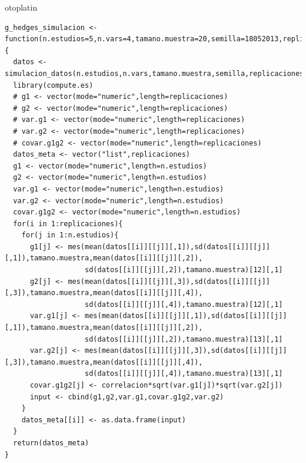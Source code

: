 otoplatin\documentclass[a4paper,openright,12pt]{report}
\begin{document}
{\begin{verbatim}
g_hedges_simulacion <- function(n.estudios=5,n.vars=4,tamano.muestra=20,semilla=18052013,replicaciones=5,correlacion=0){
  datos <- simulacion_datos(n.estudios,n.vars,tamano.muestra,semilla,replicaciones)
  library(compute.es)
  # g1 <- vector(mode="numeric",length=replicaciones)
  # g2 <- vector(mode="numeric",length=replicaciones)
  # var.g1 <- vector(mode="numeric",length=replicaciones)
  # var.g2 <- vector(mode="numeric",length=replicaciones)
  # covar.g1g2 <- vector(mode="numeric",length=replicaciones) 
  datos_meta <- vector("list",replicaciones)
  g1 <- vector(mode="numeric",length=n.estudios)
  g2 <- vector(mode="numeric",length=n.estudios)
  var.g1 <- vector(mode="numeric",length=n.estudios)
  var.g2 <- vector(mode="numeric",length=n.estudios)
  covar.g1g2 <- vector(mode="numeric",length=n.estudios) 
  for(i in 1:replicaciones){
    for(j in 1:n.estudios){
      g1[j] <- mes(mean(datos[[i]][[j]][,1]),sd(datos[[i]][[j]][,1]),tamano.muestra,mean(datos[[i]][[j]][,2]),
                   sd(datos[[i]][[j]][,2]),tamano.muestra)[12][,1]
      g2[j] <- mes(mean(datos[[i]][[j]][,3]),sd(datos[[i]][[j]][,3]),tamano.muestra,mean(datos[[i]][[j]][,4]),
                   sd(datos[[i]][[j]][,4]),tamano.muestra)[12][,1]
      var.g1[j] <- mes(mean(datos[[i]][[j]][,1]),sd(datos[[i]][[j]][,1]),tamano.muestra,mean(datos[[i]][[j]][,2]),
                   sd(datos[[i]][[j]][,2]),tamano.muestra)[13][,1]
      var.g2[j] <- mes(mean(datos[[i]][[j]][,3]),sd(datos[[i]][[j]][,3]),tamano.muestra,mean(datos[[i]][[j]][,4]),
                   sd(datos[[i]][[j]][,4]),tamano.muestra)[13][,1]
      covar.g1g2[j] <- correlacion*sqrt(var.g1[j])*sqrt(var.g2[j])
      input <- cbind(g1,g2,var.g1,covar.g1g2,var.g2)
    }
    datos_meta[[i]] <- as.data.frame(input)
  }
  return(datos_meta)
}

\end{verbatim}}
\newpage
\end{document}
